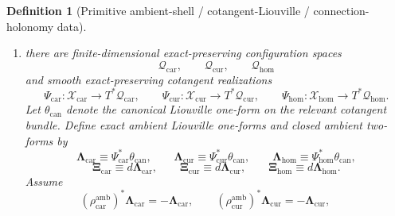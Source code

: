 \documentclass[11pt]{article}
\newcommand{\TensorSeedSpace}{\mathcal B_{\mathrm{car}}}
\newcommand{\CurSeedSpace}{\mathcal B_{\mathrm{cur}}}
\newcommand{\HomSeedSpace}{\mathcal B_{\mathrm{hom}}}
\newcommand{\TensorConstraintTarget}{\mathcal K_{\mathrm{car}}}
\newcommand{\CurConstraintTarget}{\mathcal K_{\mathrm{cur}}}
\newcommand{\HomConstraintTarget}{\mathcal K_{\mathrm{hom}}}
\newcommand{\TensorConstraintMap}{\mathfrak C_{\mathrm{car}}}
\newcommand{\CurConstraintMap}{\mathfrak C_{\mathrm{cur}}}
\newcommand{\HomConstraintMap}{\mathfrak C_{\mathrm{hom}}}
\newcommand{\TensorConstraintGap}{\delta_{\mathrm{car}}}
\newcommand{\CurConstraintGap}{\delta_{\mathrm{cur}}}
\newcommand{\HomConstraintGap}{\delta_{\mathrm{hom}}}
\newcommand{\TensorAmbientSpace}{\mathcal X_{\mathrm{car}}}
\newcommand{\CurAmbientSpace}{\mathcal X_{\mathrm{cur}}}
\newcommand{\HomAmbientSpace}{\mathcal X_{\mathrm{hom}}}
\newcommand{\TensorAmbientTimeRev}{\rho_{\mathrm{car}}^{\mathrm{amb}}}
\newcommand{\CurAmbientTimeRev}{\rho_{\mathrm{cur}}^{\mathrm{amb}}}
\newcommand{\TensorAmbientConstraintMap}{\widetilde{\mathfrak C}_{\mathrm{car}}}
\newcommand{\CurAmbientConstraintMap}{\widetilde{\mathfrak C}_{\mathrm{cur}}}
\newcommand{\HomAmbientConstraintMap}{\widetilde{\mathfrak C}_{\mathrm{hom}}}
\newcommand{\TensorConfigSpace}{\mathcal Q_{\mathrm{car}}}
\newcommand{\CurConfigSpace}{\mathcal Q_{\mathrm{cur}}}
\newcommand{\HomConfigSpace}{\mathcal Q_{\mathrm{hom}}}
\newcommand{\TensorCotangentRealization}{\Psi_{\mathrm{car}}}
\newcommand{\CurCotangentRealization}{\Psi_{\mathrm{cur}}}
\newcommand{\HomCotangentRealization}{\Psi_{\mathrm{hom}}}
\newcommand{\TensorAmbientLiouville}{\boldsymbol{\Lambda}_{\mathrm{car}}}
\newcommand{\CurAmbientLiouville}{\boldsymbol{\Lambda}_{\mathrm{cur}}}
\newcommand{\HomAmbientLiouville}{\boldsymbol{\Lambda}_{\mathrm{hom}}}
\newcommand{\TensorAmbientTwo}{\boldsymbol{\Xi}_{\mathrm{car}}}
\newcommand{\CurAmbientTwo}{\boldsymbol{\Xi}_{\mathrm{cur}}}
\newcommand{\HomAmbientTwo}{\boldsymbol{\Xi}_{\mathrm{hom}}}
\newtheorem{definition}{Definition}
\begin{document}
\begin{definition}[Primitive ambient-shell / cotangent-Liouville / connection-holonomy data]
\begin{enumerate}
    \[
    \TensorAmbientConstraintMap:\TensorAmbientSpace\to\TensorConstraintTarget,\qquad
    \CurAmbientConstraintMap:\CurAmbientSpace\to\CurConstraintTarget,\qquad
    \HomAmbientConstraintMap:\HomAmbientSpace\to\HomConstraintTarget
    \]
    preserved by the corresponding ambient time reversals and vanishing on the corresponding ambient unit sections. Define the recorded seed exact-constraint maps by shell restriction:
    \begin{equation}
    \TensorConstraintMap\equiv\TensorAmbientConstraintMap|_{\TensorSeedSpace},\qquad
    \CurConstraintMap\equiv\CurAmbientConstraintMap|_{\CurSeedSpace},\qquad
    \HomConstraintMap\equiv\HomAmbientConstraintMap|_{\HomSeedSpace}.
    \label{eq:constraint_from_ambient}
    \end{equation}
    Assume these restricted maps satisfy the same recorded positive exact-constraint gap bounds \(\TensorConstraintGap,\CurConstraintGap,\HomConstraintGap>0\) on the current exact-constraint shells used in the immediately preceding note.
    \item there are finite-dimensional exact-preserving configuration spaces
    \[
    \TensorConfigSpace,\qquad
    \CurConfigSpace,\qquad
    \HomConfigSpace
    \]
    and smooth exact-preserving cotangent realizations
    \[
    \TensorCotangentRealization:\TensorAmbientSpace\to T^*\TensorConfigSpace,\qquad
    \CurCotangentRealization:\CurAmbientSpace\to T^*\CurConfigSpace,\qquad
    \HomCotangentRealization:\HomAmbientSpace\to T^*\HomConfigSpace.
    \]
    Let \(\theta_{\mathrm{can}}\) denote the canonical Liouville one-form on the relevant cotangent bundle. Define exact ambient Liouville one-forms and closed ambient two-forms by
    \begin{equation}
    \TensorAmbientLiouville\equiv\TensorCotangentRealization^*\theta_{\mathrm{can}},\qquad
    \CurAmbientLiouville\equiv\CurCotangentRealization^*\theta_{\mathrm{can}},\qquad
    \HomAmbientLiouville\equiv\HomCotangentRealization^*\theta_{\mathrm{can}},
    \label{eq:ambient_liouville}
    \end{equation}
    \begin{equation}
    \TensorAmbientTwo\equiv d\TensorAmbientLiouville,\qquad
    \CurAmbientTwo\equiv d\CurAmbientLiouville,\qquad
    \HomAmbientTwo\equiv d\HomAmbientLiouville.
    \label{eq:ambient_two}
    \end{equation}
    Assume
    \[
    (\TensorAmbientTimeRev)^*\TensorAmbientLiouville=-\TensorAmbientLiouville,\qquad
    (\CurAmbientTimeRev)^*\CurAmbientLiouville=-\CurAmbientLiouville,\qquad
\]
\end{enumerate}
\end{definition}
\end{document}
